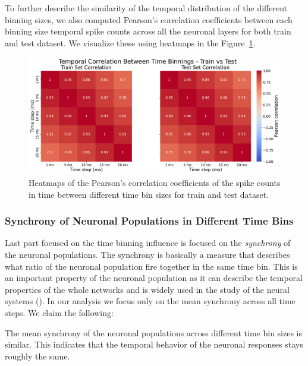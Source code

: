 To further describe the similarity of the temporal distribution of the different binning sizes, we also computed Pearson's correlation coefficients between each binning size temporal spike counts across all the neuronal layers for both train and test dataset. We visualize these using heatmaps in the Figure~\ref{fig:correlation_time_bin_size}.

\begin{figure}
    \centering
    \includegraphics[width=\linewidth]{img/plots/temporal_correlation_time_bin_size.pdf}
    \caption{Heatmaps of the Pearson's correlation coefficients of the spike counts in time between different time bin sizes for train and test dataset.}
    \label{fig:correlation_time_bin_size}
\end{figure}

\subsubsection{Synchrony of Neuronal Populations in Different Time Bins}
\label{subsubsec:neuron_synchrony_binning}

Last part focused on the time binning influence is focused on the \emph{synchrony} of the neuronal populations. The synchrony is basically a measure that describes what ratio of the neuronal population fire together in the same time bin. This is an important property of the neuronal population as it can describe the temporal properties of the whole networks and is widely used in the study of the neural systems (\citet{Singer1999}). In our analysis we focus only on the mean synchrony across all time steps. We claim the following:

\begin{claim}
    The mean synchrony of the neuronal populations across different time bin sizes is similar. This indicates that the temporal behavior of the neuronal responses stays roughly the same.
\end{claim}
\label{claim:synchrony_time_bins_size}

